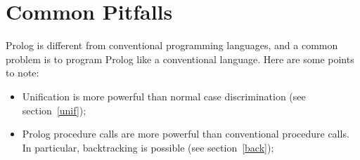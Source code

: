 
\section{Common Pitfalls}
Prolog is different from conventional programming languages, and a common
problem is to program Prolog like a conventional language. Here are some
points to note:

\begin{itemize}
\item Unification is more powerful than normal case discrimination (see 
  section~\ref{unif}); 
\item Prolog procedure calls are more powerful than conventional procedure
calls. In particular, backtracking is possible (see section~\ref{back});
\end{itemize}

